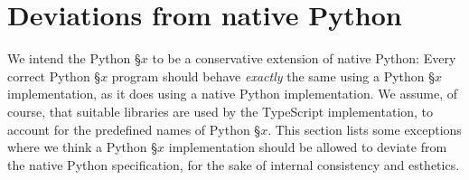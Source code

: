 \section*{Deviations from native Python}

We intend the Python \S $x$ to be a conservative extension of 
native Python: Every correct Python \S $x$ program should behave 
\emph{exactly} the same using a Python \S $x$ implementation, as it does 
using a native Python implementation. We assume, of course, that 
suitable libraries are used by the TypeScript implementation, to 
account for the predefined names of Python \S $x$. 
This section lists some exceptions where we think a Python \S $x$ 
implementation should be allowed to deviate from the native Python 
specification, for the sake of internal consistency and esthetics.

